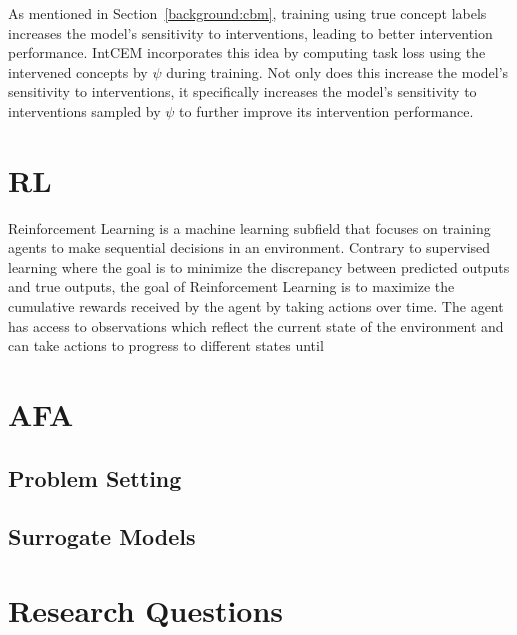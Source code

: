 \documentclass[../main.tex]{subfiles}
\begin{document}
As mentioned in Section~\ref{background:cbm}, training using
true concept labels increases the model's sensitivity
to interventions, leading to better intervention performance.
IntCEM incorporates this idea by computing task loss
using the intervened concepts by $\psi$ during training.
Not only does this increase the model's sensitivity to interventions,
it specifically increases the model's sensitivity to interventions
sampled by $\psi$ to further improve its intervention performance.

\section{RL} %
Reinforcement Learning is a machine learning subfield that 
focuses on training agents to make sequential decisions in an environment.
Contrary to supervised learning
where the goal is to minimize the discrepancy between predicted outputs and true outputs,
the goal of Reinforcement Learning is to maximize the cumulative rewards received by the agent
by taking actions over time. The agent has access to observations which reflect the current state
 of the environment and can take actions to progress to different states until 

\section{AFA}

\subsection{Problem Setting} %

\subsection{Surrogate Models} %

\section{Research Questions} %
\end{document}
